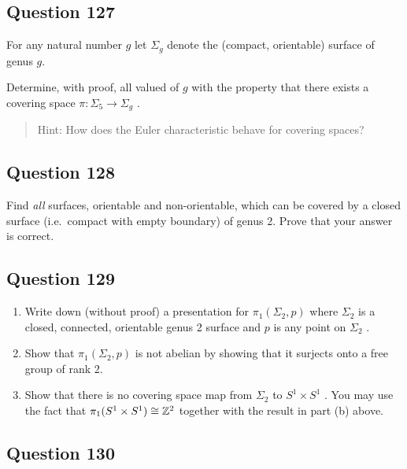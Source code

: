\documentclass[12pt]{article}
\begin{document}
\hypertarget{question-127-1}{%
\subsection{Question 127}\label{question-127-1}}

For any natural number \(g\) let \(\Sigma_g\) denote the (compact,
orientable) surface of genus \(g\).

Determine, with proof, all valued of \(g\) with the property that there
exists a covering space \(\pi : \Sigma_5 \to \Sigma_g\) .

\begin{quote}
Hint: How does the Euler characteristic behave for covering spaces?
\end{quote}

\hypertarget{question-128-1}{%
\subsection{Question 128}\label{question-128-1}}

Find \emph{all} surfaces, orientable and non-orientable, which can be
covered by a closed surface (i.e.~compact with empty boundary) of genus
2. Prove that your answer is correct.

\hypertarget{question-129-1}{%
\subsection{Question 129}\label{question-129-1}}

\begin{enumerate}
\def\labelenumi{\alph{enumi}.}
\item
  Write down (without proof) a presentation for \(\pi_1 (\Sigma_2 , p)\)
  where \(\Sigma_2\) is a closed, connected, orientable genus 2 surface
  and \(p\) is any point on \(\Sigma_2\) .
\item
  Show that \(\pi_1 (\Sigma_2 , p)\) is not abelian by showing that it
  surjects onto a free group of rank 2.
\item
  Show that there is no covering space map from \(\Sigma_2\) to
  \(S^1 \times S^1\) . You may use the fact that
  \(\pi_1 (S^1 \times S^1 ) \cong {\mathbb{Z}}^2\) together with the result in
  part (b) above.
\end{enumerate}

\hypertarget{question-130-1}{%
\subsection{Question 130}\label{question-130-1}}
\end{document}
